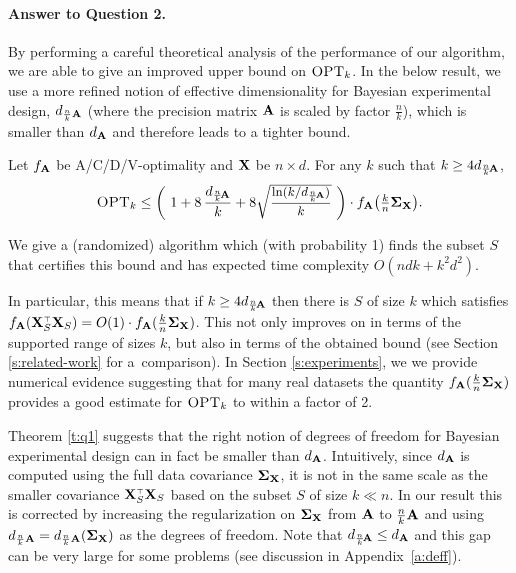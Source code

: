 \documentclass[11pt]{article}
\begin{document}
\paragraph{Answer to Question 2.}
By performing a careful theoretical analysis of the performance of our
algorithm, we are able to give an improved upper bound on ${\textsc{OPT}_k}$. In the below
result, we use a more refined notion of effective dimensionality for
Bayesian experimental design,
$d_{\frac nk\mathbf A}$ (where the precision matrix $\mathbf A$ is scaled by factor $\frac
nk$), which is smaller than $d_\mathbf A$ and therefore leads 
to a tighter bound.
\begin{theorem}\label{t:q1}
  Let $f_{\mathbf A}$ be A/C/D/V-optimality and $\mathbf X$ be
  $n\times d$. For any $k$ such that $k\geq 4d_{\frac
    nk\!\mathbf A}$, %
  \begin{align*}
\opt    \leq \bigg(\ 1+8\,\frac{d_{\frac
    nk\!\A}}{k} + 8\sqrtshort{\frac{\ln (k/d_{\frac nk\!\A})}{k}}\
    \bigg)\cdot f_{\A}\big(\tfrac kn\Sigmab_{\X}\big).
  \end{align*}
\end{theorem}
\begin{remark}
  We give a (randomized) algorithm which (with probability 1) finds
  the subset $S$ that certifies this bound and has expected time
  complexity $O(ndk+k^2d^2)$. 
\end{remark}
  In particular, this means that if $k\geq 4d_{\frac nk\!\mathbf A}$
  then there is $S$ of size $k$
  which satisfies $f_{\A}(\X_S^\top\X_S) = O(1)\cdot f_{\A}(\frac kn\Sigmab_{\X})$.
  This not only improves on \cite{regularized-volume-sampling} in terms
  of the supported range of sizes $k$, but also in terms of the obtained bound (see
  Section \ref{s:related-work} for a~comparison). In Section
  \ref{s:experiments}, we we provide numerical evidence suggesting
  that for many real datasets the quantity $f_{\mathbf A}(\frac
  kn\mathbf{\Sigma}_{\mathbf X})$ provides a good estimate for ${\textsc{OPT}_k}$ to within a
  factor of 2.

Theorem \ref{t:q1} suggests that the right notion of degrees of
freedom for Bayesian experimental design can in fact be smaller
than $d_{\mathbf A}$.  
Intuitively, since $d_{\mathbf A}$ is computed using the full data covariance
$\mathbf{\Sigma}_{\mathbf X}$, it is not in the same scale as the smaller covariance
$\X_S^\top\X_S$ based on the subset $S$ of size $k\ll n$. In our
result this is corrected by increasing the 
regularization on $\mathbf{\Sigma}_\mathbf X$ from $\mathbf A$ to $\frac{n}{k}\mathbf A$ and using
$d_{\frac nk\mathbf A}=d_{\frac{n}{k}\mathbf A}(\mathbf{\Sigma}_\mathbf X)$ as the degrees of
freedom. 
Note that $d_{\frac nk\!\mathbf A}\leq d_{\mathbf A}$ and this gap can be very large for some
problems (see discussion in Appendix~\ref{a:deff}).
\end{document}
